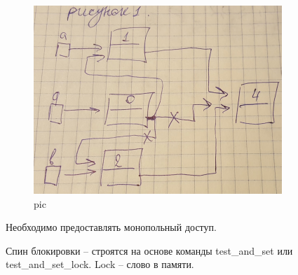 \begin{figure}[H]
  \centering
  \includegraphics[width=\textwidth]{pic/1.png}
  \caption{pic}
\end{figure}

Необходимо предоставлять монопольный доступ.

Спин блокировки – строятся на основе команды test\_and\_set или test\_and\_set\_lock. Lock – слово в памяти.





